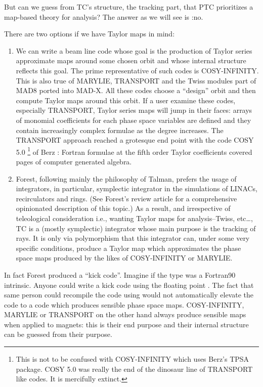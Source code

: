 \documentclass{hitec}     %
\begin{document}
{{{ But can we guess from TC's structure, the tracking part, that PTC prioritizes  a map-based theory for analysis? The answer as we will see is :no.
 
 There are two options if we have Taylor maps in mind: 
 
 \begin{enumerate}
 \item We can write a beam line code whose goal is the production of Taylor series approximate maps around some chosen orbit and whose internal structure reflects this goal. 
 The prime representative of such codes is COSY-INFINITY\cite{cosy9,cosynim}. This is also true of MARYLIE,  TRANSPORT\cite{slac75} and the Twiss modules part of MAD8 ported into  MAD-X. All these codes choose a ``design'' orbit and then compute Taylor maps around this orbit. If a user examine these codes, especially  TRANSPORT, Taylor series maps will jump in their faces: arrays of monomial coefficients for each phase space variables are defined and they contain increasingly complex  formulae as the degree increases. The TRANSPORT approach reached a grotesque end point with the code COSY 5.0
 \footnote{This is not to be confused with COSY-INFINITY which uses Berz's TPSA package. COSY 5.0\cite{cosy5ham} was really the end of the dinosaur line of TRANSPORT like codes. It is mercifully extinct.}
% 
 of Berz : Fortran formulae at the fifth order Taylor coefficients covered pages of computer generated algebra.
 \item
 Forest, following mainly the philosophy of Talman, prefers the usage of integrators, in particular, symplectic integrator in the simulations of LINACs, recirculators and rings. (See Forest's review article \cite{forestreview} for a comprehensive opinionated description of this topic.)  As a result, and irrespective of teleological consideration i.e., wanting Taylor maps for analysis--Twiss, etc\ldots, TC  is a (mostly symplectic) integrator whose main purpose is the tracking of rays. It is only via polymorphism that this integrator can, under some very specific conditions, produce a Taylor map which approximates the phase space maps produced by the likes of COSY-INFINITY or MARYLIE.
  \end{enumerate}
  
 In fact Forest produced a ``kick code''. Imagine if the type  was a Fortran90 intrinsic. Anyone could write a kick code using the floating point . The fact that same person could recompile the code using  would not automatically elevate the code to a code which produces sensible phase space maps. COSY-INFINITY, MARYLIE or TRANSPORT on the other hand always produce sensible maps when applied to magnets: this is their end purpose and their internal structure can be guessed from their purpose.

}}}
\end{document}
